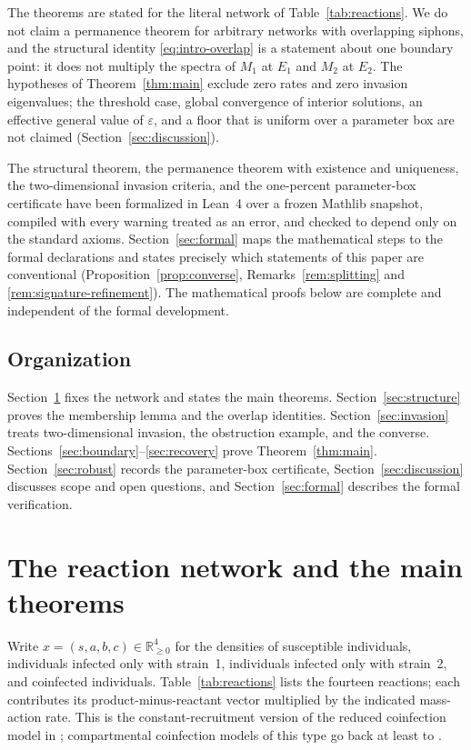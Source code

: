 \documentclass[11pt,a4paper]{article}
\theoremstyle{plain}
\theoremstyle{definition}
\theoremstyle{remark}
\newcommand{\R}{\mathbb R}
\newcommand{\eps}{\varepsilon}
\begin{document}
The theorems are stated for the literal network of Table~\ref{tab:reactions}. We do not claim a permanence theorem for arbitrary networks with overlapping siphons, and the structural identity \eqref{eq:intro-overlap} is a statement about one boundary point: it does not multiply the spectra of $M_1$ at $E_1$ and $M_2$ at $E_2$. The hypotheses of Theorem~\ref{thm:main} exclude zero rates and zero invasion eigenvalues; the threshold case, global convergence of interior solutions, an effective general value of $\eps$, and a floor that is uniform over a parameter box are not claimed (Section~\ref{sec:discussion}).

The structural theorem, the permanence theorem with existence and uniqueness, the two-dimensional invasion criteria, and the one-percent parameter-box certificate have been formalized in Lean~4 \citep{deMouraUllrich2021} over a frozen Mathlib \citep{mathlib2020} snapshot, compiled with every warning treated as an error, and checked to depend only on the standard axioms. Section~\ref{sec:formal} maps the mathematical steps to the formal declarations and states precisely which statements of this paper are conventional (Proposition~\ref{prop:converse}, Remarks~\ref{rem:splitting} and \ref{rem:signature-refinement}). The mathematical proofs below are complete and independent of the formal development.

\subsection{Organization}

Section~\ref{sec:model} fixes the network and states the main theorems. Section~\ref{sec:structure} proves the membership lemma and the overlap identities. Section~\ref{sec:invasion} treats two-dimensional invasion, the obstruction example, and the converse. Sections~\ref{sec:boundary}--\ref{sec:recovery} prove Theorem~\ref{thm:main}. Section~\ref{sec:robust} records the parameter-box certificate, Section~\ref{sec:discussion} discusses scope and open questions, and Section~\ref{sec:formal} describes the formal verification.

\section{The reaction network and the main theorems}\label{sec:model}

Write $x=(s,a,b,c)\in\R_{\ge0}^4$ for the densities of susceptible individuals, individuals infected only with strain~1, individuals infected only with strain~2, and coinfected individuals. Table~\ref{tab:reactions} lists the fourteen reactions; each contributes its product-minus-reactant vector multiplied by the indicated mass-action rate. This is the constant-recruitment version of the reduced coinfection model in \citep[Section~6]{AvramAdenaneBasnarkovHorvath2025}; compartmental coinfection models of this type go back at least to \citep{MartchevaPilyugin2006,GaoPorcoRuan2016}.
\end{document}
